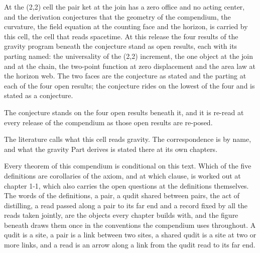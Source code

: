 \begin{chwall}
At the (2,2) cell the pair ket at the join has a zero office and no acting center, and the derivation conjectures that the geometry of the compendium, the curvature, the field equation at the counting face and the horizon, is carried by this cell, the cell that reads spacetime. At this release the four results of the gravity program beneath the conjecture stand as open results, each with its parting named: the universality of the (2,2) increment, the one object at the join and at the chain, the two-point function at zero displacement and the area law at the horizon web. The two faces are the conjecture as stated and the parting at each of the four open results; the conjecture rides on the lowest of the four and is stated as a conjecture.
\end{chwall}
\chdeps{}{}
The conjecture stands on the four open results beneath it, and it is re-read at every release of the compendium as those open results are re-posed.
\begin{chbridge}
The literature calls what this cell reads gravity. The correspondence is by name, and what the gravity Part derives is stated there at its own chapters.
\end{chbridge}
Every theorem of this compendium is conditional on this text. Which of the five definitions are corollaries of the axiom, and at which clause, is worked out at chapter 1-1, which also carries the open questions at the definitions themselves. The words of the definitions, a pair, a qudit shared between pairs, the act of distilling, a read passed along a pair to its far end and a record fixed by all the reads taken jointly, are the objects every chapter builds with, and the figure beneath draws them once in the conventions the compendium uses throughout. A qudit is a site, a pair is a link between two sites, a shared qudit is a site at two or more links, and a read is an arrow along a link from the qudit read to its far end.
